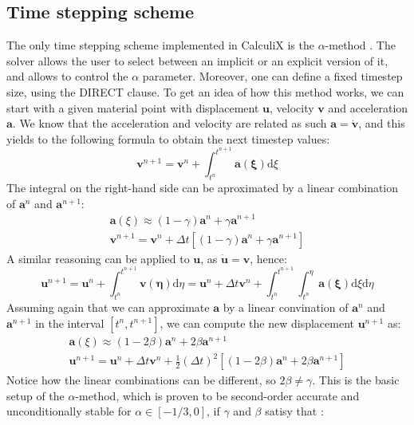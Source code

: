 \documentclass[
  english,        %
  font=times,     %
  onecolumn,      %
]{tumarticle}
\begin{document}
\subsection{Time stepping scheme}\label{sec:alpha}
The only time stepping scheme implemented in CalculiX is the $\alpha$-method \cite{dhondt2017calculix}. The solver allows the user to select between an implicit or an explicit version of it, and allows to control the $\alpha$ parameter. Moreover, one can define a fixed timestep size, using the DIRECT clause. To get an idea of how this method works, we can start with a given material point with displacement $\boldsymbol{u}$, velocity $\boldsymbol{v}$ and acceleration $\boldsymbol{a}$. We know that the acceleration and velocity are related as such $\boldsymbol{a} = \dot{\boldsymbol{v}}$, and this yields to the following formula to obtain the next timestep values:
\begin{equation}
    \boldsymbol{v}^{n+1} = \boldsymbol{v}^n + \int_{t^n}^{t^{n+1}} \boldsymbol{a(\xi)} \text{d}\xi
\end{equation}
The integral on the right-hand side can be aproximated by a linear combination of $ \boldsymbol{a}^n$ and $\boldsymbol{a}^{n+1}$:
\begin{gather}
    \boldsymbol{a}(\xi) \approx  (1 - \gamma) \boldsymbol{a}^n + \gamma \boldsymbol{a}^{n+1}\\
    \boldsymbol{v}^{n+1} = \boldsymbol{v}^n + \Delta t \left[ (1 - \gamma) \boldsymbol{a}^n + \gamma \boldsymbol{a}^{n+1} \right]
\end{gather} 
A similar reasoning can be applied to $\boldsymbol{u}$, as $\boldsymbol{\dot{u}} = \boldsymbol{v}$, hence:
\begin{equation}
    \boldsymbol{u}^{n+1} 
    = \boldsymbol{u}^n + \int_{t^n}^{t^{n+1}} \boldsymbol{v(\eta)}  \text{d}\eta 
    = \boldsymbol{u}^n + \Delta t \boldsymbol{v}^n + \int_{t^n}^{t^{n+1}} \int_{t^n}^{\eta} \boldsymbol{a(\xi)} \text{d}\xi \text{d}\eta 
\end{equation}
Assuming again that we can approximate $\boldsymbol{a}$ by a linear convination of $ \boldsymbol{a}^n$ and $\boldsymbol{a}^{n+1}$ in the interval $\left[ t^n, t^{n+1} \right]$, we can compute the new displacement $\boldsymbol{u}^{n+1}$ as:
\begin{gather}
    \boldsymbol{a}(\xi) \approx  (1 - 2\beta) \boldsymbol{a}^n + 2\beta \boldsymbol{a}^{n+1}\\
    \boldsymbol{u}^{n+1} = \boldsymbol{u}^n + \Delta t \boldsymbol{v}^n
    + \frac{1}{2} (\Delta t)^2 \left[ (1 - 2\beta) \boldsymbol{a}^n + 2\beta \boldsymbol{a}^{n+1} \right]
\end{gather} 
Notice how the linear combinations can be different, so $2\beta \neq \gamma$. This is the basic setup of the $\alpha$-method, which is proven to be second-order accurate and unconditionally stable for $\alpha \in [-1/3, 0]$, if $\gamma$ and $\beta$ satisy that \cite{dhondt2004finite}:
\end{document}
